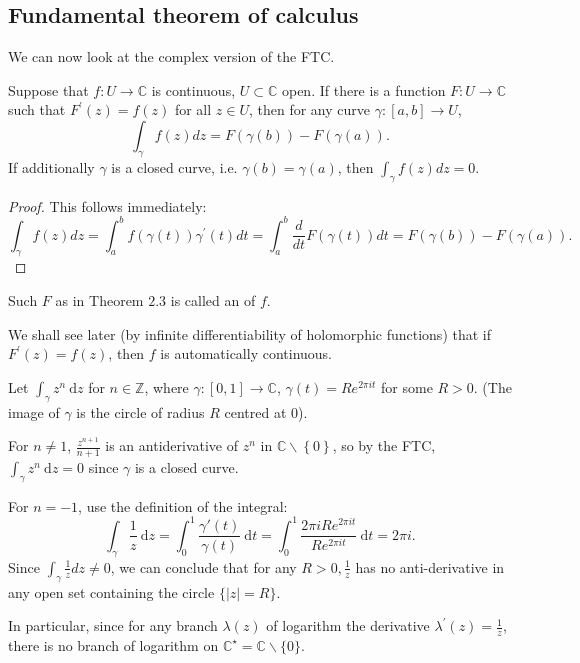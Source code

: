 \documentclass[a4paper]{scrartcl}
\begin{document}
\subsection{Fundamental theorem of calculus}
We can now look at the complex version of the FTC.
\begin{theorem}
     Suppose that $f: U \rightarrow \mathbb{C}$ is continuous, $U \subset \mathbb{C}$ open. If there is a function $F: U \rightarrow \mathbb{C}$ such that $F^{\prime}(z)=f(z)$ for all $z \in U$, then for any curve $\gamma:[a, b] \rightarrow U$,
     $$
     \int_{\gamma} f(z) d z=F(\gamma(b))-F(\gamma(a)) .
     $$
     If additionally $\gamma$ is a closed curve, i.e. $\gamma(b)=\gamma(a)$, then $\int_{\gamma} f(z) d z=0$.
\end{theorem}
\begin{proof}
     This follows immediately:
      \[
          \int_{\gamma} f(z) d z=\int_{a}^{b} f(\gamma(t)) \gamma^{\prime}(t) d t=\int_{a}^{b} \frac{d}{d t} F(\gamma(t)) d t=F(\gamma(b))-F(\gamma(a))
      .\] 
\end{proof}
\begin{remark}
     Such $F$ as in Theorem $2.3$ is called an  of $f$.
     
     We shall see later (by infinite differentiability of holomorphic functions) that if $F^{\prime}(z)=f(z)$, then $f$ is automatically continuous.
\end{remark}
\begin{example*}
      Let $\int_{\gamma}^{}z^{n} \ \mathrm{d}z $ for $n \in \mathbb{Z}$, where $\gamma: [0,1]\rightarrow \mathbb{C}$, $\gamma (t)=R e^{2\pi it}$ for some $R>0$. (The image of $\gamma$ is the circle of radius $R$ centred at 0). 

      For $n \neq 1$, $ \frac{z^{n+1}}{n+1}$ is an antiderivative of $z^{n}$ in $\mathbb{C}\backslash \left\{0\right\}$, so by the FTC, $\int_{\gamma}^{}z^{n} \ \mathrm{d}z =0$ since $\gamma$ is a closed curve.

      For $n=-1$, use the definition of the integral: \[
          \int_{\gamma}^{}\frac{1}{z} \ \mathrm{d}z =\int_{0}^{1} \frac{\gamma' (t)}{\gamma (t)} \ \mathrm{d}t=\int_{0}^{1} \frac{2 \pi iR e^{2\pi it}}{R e^{2\pi it}} \ \mathrm{d}t= 2 \pi i
      .\] 
      Since $\int_{\gamma} \frac{1}{z} d z \neq 0$, we can conclude that for any $R>0, \frac{1}{z}$ has no anti-derivative in any open set containing the circle $\{|z|=R\}$.

      In particular, since for any branch $\lambda(z)$ of logarithm the derivative $\lambda^{\prime}(z)=\frac{1}{z}$, there is no branch of logarithm on $\mathbb{C}^{\star}=\mathbb{C} \backslash\{0\} .$
\end{example*}
\end{document}
